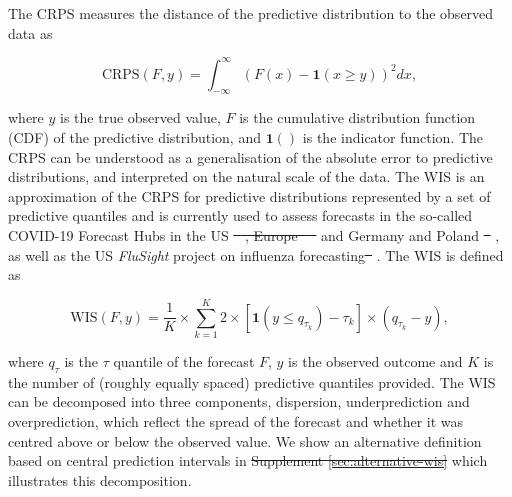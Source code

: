 \documentclass[10pt,letterpaper]{article} %
\providecommand{\DIFaddtex}[1]{{\protect\color{blue}\uwave{#1}}} %
\providecommand{\DIFdeltex}[1]{{\protect\color{red}\sout{#1}}}                      %
\providecommand{\DIFaddbegin}{} %
\providecommand{\DIFaddend}{} %
\providecommand{\DIFdelbegin}{} %
\providecommand{\DIFdelend}{} %
\providecommand{\DIFadd}[1]{\texorpdfstring{\DIFaddtex{#1}}{#1}} %
\providecommand{\DIFdel}[1]{\texorpdfstring{\DIFdeltex{#1}}{}} %
\newcommand{\DIFscaledelfig}{0.5}
\newlength{\DIFdelgraphicswidth} %
\newlength{\DIFdelgraphicsheight} %
\newcommand{\DIFaddincludegraphics}[2][]{{\color{blue}\fbox{\DIFOincludegraphics[#1]{#2}}}} %
\newcommand{\DIFdelincludegraphics}[2][]{%
\sbox{\DIFdelgraphicsbox}{\DIFOincludegraphics[#1]{#2}}%
\settoboxwidth{\DIFdelgraphicswidth}{\DIFdelgraphicsbox} %
\settoboxtotalheight{\DIFdelgraphicsheight}{\DIFdelgraphicsbox} %
\scalebox{\DIFscaledelfig}{%
\parbox[b]{\DIFdelgraphicswidth}{\usebox{\DIFdelgraphicsbox}\\[-\baselineskip] \rule{\DIFdelgraphicswidth}{0em}}\llap{\resizebox{\DIFdelgraphicswidth}{\DIFdelgraphicsheight}{%
\setlength{\unitlength}{\DIFdelgraphicswidth}%
\begin{picture}(1,1)%
\thicklines\linethickness{2pt} %
{\color[rgb]{1,0,0}\put(0,0){\framebox(1,1){}}}%
{\color[rgb]{1,0,0}\put(0,0){\line( 1,1){1}}}%
{\color[rgb]{1,0,0}\put(0,1){\line(1,-1){1}}}%
\end{picture}%
}\hspace*{3pt}}} %
} %
\DeclareRobustCommand{\DIFaddbegin}{\DIFOaddbegin \let\includegraphics\DIFaddincludegraphics} %
\DeclareRobustCommand{\DIFaddend}{\DIFOaddend \let\includegraphics\DIFOincludegraphics} %
\DeclareRobustCommand{\DIFdelbegin}{\DIFOdelbegin \let\includegraphics\DIFdelincludegraphics} %
\DeclareRobustCommand{\DIFdelend}{\DIFOaddend \let\includegraphics\DIFOincludegraphics} %
\begin{document}
The CRPS measures the distance of the predictive distribution to the observed data as 
\begin{linenomath*}
\begin{equation}
    \text{CRPS}(F, y) = \int_{-\infty}^\infty \left( F(x) - \boldsymbol{1}(x \geq y) \right)^2 dx,
\end{equation}    
\end{linenomath*}
\DIFaddbegin 

\DIFaddend where $y$ is the true observed value, $F$ is the cumulative distribution function (CDF) of the predictive distribution, and $\boldsymbol{1}()$ is the indicator function. The CRPS can be understood as a generalisation of the absolute error to predictive distributions, and interpreted on the natural scale of the data. The WIS is an approximation of the CRPS for predictive distributions represented by a set of predictive quantiles and is currently used to assess forecasts in the so-called COVID-19 Forecast Hubs in the US \DIFdelbegin \DIFdel{\mbox{%
\citep{cramerCOVID19ForecastHub2020, cramerEvaluationIndividualEnsemble2021}}\hskip0pt%
, Europe \mbox{%
\citep{sherrattPredictivePerformanceMultimodel2022} }\hskip0pt%
}\DIFdelend \DIFaddbegin \DIFadd{\mbox{%
\cite{cramerCOVID19ForecastHub2020, cramerEvaluationIndividualEnsemble2021}}\hskip0pt%
, Europe \mbox{%
\cite{sherrattPredictivePerformanceMultimodel2022} }\hskip0pt%
}\DIFaddend and Germany and Poland \DIFdelbegin \DIFdel{\mbox{%
\citep{bracherShorttermForecastingCOVID192021, bracherNationalSubnationalShortterm2021}}\hskip0pt%
}\DIFdelend \DIFaddbegin \DIFadd{\mbox{%
\cite{bracherShorttermForecastingCOVID192021, bracherNationalSubnationalShortterm2021}}\hskip0pt%
}\DIFaddend , as well as the US \textit{FluSight} project on influenza forecasting\DIFdelbegin \DIFdel{\mbox{%
\citep{CdcepiFlusightforecastdata2022}}\hskip0pt%
}\DIFdelend \DIFaddbegin \DIFadd{\mbox{%
\cite{CdcepiFlusightforecastdata2022}}\hskip0pt%
}\DIFaddend . The WIS is defined as 
\begin{linenomath*}
\begin{equation}
    \text{WIS}(F, y) = \frac{1}{K} \times \sum_{k = 1}^{K} 2 \times \left[ \boldsymbol{1}(y \leq q_{\tau_k}) - \tau_k \right] \times ( q_{\tau_k} - y), 
\end{equation}
\end{linenomath*}
where $q_{\tau}$ is the $\tau$ quantile of the forecast $F$, $y$ is the observed outcome and $K$ is the number of (roughly equally spaced) predictive quantiles provided. The WIS can be decomposed into three components, dispersion, underprediction and overprediction, which reflect the spread of the forecast and whether it was centred above or below the observed value. We show an alternative definition based on central prediction intervals in \DIFdelbegin \DIFdel{Supplement \ref{sec:alternative-wis} }\DIFdelend \DIFaddbegin {} \DIFaddend which illustrates this decomposition. 
\end{document}
